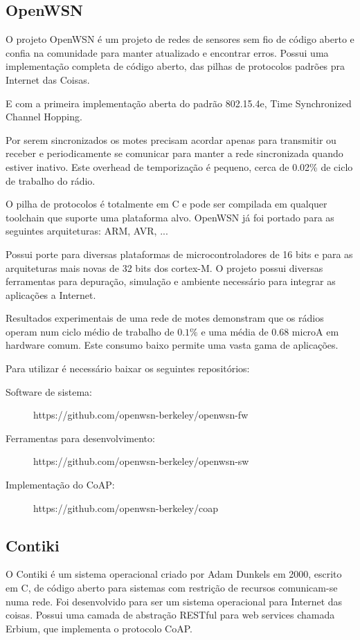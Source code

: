 \subsection{OpenWSN}

O projeto OpenWSN \'e um projeto de redes de sensores sem fio de c\'odigo aberto e confia na comunidade para manter atualizado e encontrar erros. Possui uma implementa\c{c}\~ao completa de c\'odigo aberto, das pilhas de protocolos padr\~oes pra Internet das Coisas.

E com a primeira implementa\c{c}\~ao aberta do padr\~ao 802.15.4e, Time Synchronized Channel Hopping.

Por serem sincronizados os motes precisam acordar apenas para transmitir ou receber e periodicamente se comunicar para manter a rede sincronizada quando estiver inativo. Este overhead de temporiza\c{c}\~ao \'e pequeno, cerca de 0.02\% de ciclo de trabalho do r\'adio. \cite{openWSNPaper}

O pilha de protocolos \'e totalmente em C e pode ser compilada em qualquer toolchain que suporte uma plataforma alvo. OpenWSN j\'a foi portado para as seguintes arquiteturas: ARM, AVR, ...

Possui porte para diversas plataformas de microcontroladores de 16 bits e para as arquiteturas mais novas de 32 bits dos cortex-M. O projeto possui diversas ferramentas para depura\c{c}\~ao, simula\c{c}\~ao e ambiente necess\'ario para integrar as aplica\c{c}\~oes a Internet.\cite{openWSN}

Resultados experimentais de uma rede de motes demonstram que os r\'adios operam num ciclo m\'edio de trabalho de $0.1\%$ e uma m\'edia de 0.68 microA em hardware comum. Este consumo baixo permite uma vasta gama de aplica\c{c}\~oes.

Para utilizar \'e necess\'ario baixar os seguintes reposit\'orios:
\begin{description}
    \item [Software de sistema:] https://github.com/openwsn-berkeley/openwsn-fw
    \item [Ferramentas para desenvolvimento:] https://github.com/openwsn-berkeley/openwsn-sw 
    \item[Implementa\c{c}\~ao do CoAP:] https://github.com/openwsn-berkeley/coap
\end{description}


\subsection{Contiki}
O Contiki \'e um sistema operacional criado por Adam Dunkels em 2000, escrito em C, de c\'odigo aberto para sistemas com restri\c{c}\~ao de recursos comunicam-se numa rede. Foi desenvolvido para ser um sistema operacional para Internet das coisas. Possui uma camada de abstra\c{c}\~ao RESTful para web services chamada Erbium, que implementa o protocolo CoAP.

